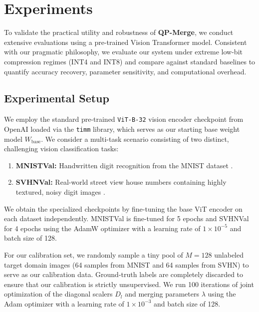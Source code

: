 \section{Experiments}
\label{sec:experiments}

To validate the practical utility and robustness of \textbf{QP-Merge}, we conduct extensive evaluations using a pre-trained Vision Transformer model. Consistent with our pragmatic philosophy, we evaluate our system under extreme low-bit compression regimes (INT4 and INT8) and compare against standard baselines to quantify accuracy recovery, parameter sensitivity, and computational overhead.

\subsection{Experimental Setup}
We employ the standard pre-trained \texttt{ViT-B-32} vision encoder checkpoint from OpenAI \cite{radford2021learning} loaded via the \texttt{timm} library, which serves as our starting base weight model $W_{\text{base}}$. We consider a multi-task scenario consisting of two distinct, challenging vision classification tasks:
\begin{enumerate}
    \item \textbf{MNISTVal:} Handwritten digit recognition from the MNIST dataset \cite{lecun1998mnist}.
    \item \textbf{SVHNVal:} Real-world street view house numbers containing highly textured, noisy digit images \cite{netzer2011svhn}.
\end{enumerate}
We obtain the specialized checkpoints by fine-tuning the base ViT encoder on each dataset independently. MNISTVal is fine-tuned for 5 epochs and SVHNVal for 4 epochs using the AdamW optimizer \cite{loshchilov2017adamw} with a learning rate of $1\times 10^{-5}$ and batch size of 128.

For our calibration set, we randomly sample a tiny pool of $M = 128$ unlabeled target domain images (64 samples from MNIST and 64 samples from SVHN) to serve as our calibration data. Ground-truth labels are completely discarded to ensure that our calibration is strictly unsupervised. We run 100 iterations of joint optimization of the diagonal scalers $D_l$ and merging parameters $\lambda$ using the Adam optimizer with a learning rate of $1\times 10^{-3}$ and batch size of 128.

